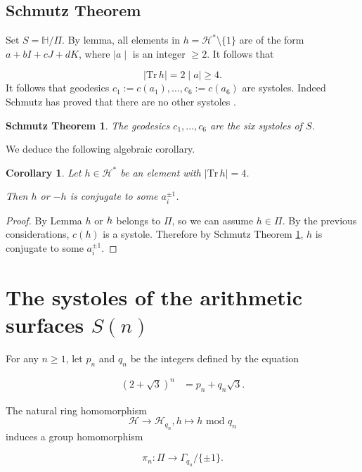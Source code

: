 \documentclass[12pt]{amsart}
\newcommand{\HP}{\mathbb{H}}
\newcommand{\Tr}{{\mathrm {Tr}}}
\renewcommand{\mod}{\,\mathrm{mod}\,}
\newtheorem{Schmutz}[lemma]{Schmutz Theorem}
\newtheorem{cor}[lemma]{Corollary}
\newcommand{\cH}{\mathcal{H}}
\begin{document}
\subsection{Schmutz Theorem}


Set $S=\HP/\Pi$. By lemma, all elements in
$h=\cH^*\setminus\{1\}$ are of the form
$a+bI+cJ+dK$, where $\mid a\mid $ is an integer $\geq 2$.
It follows that 

$$\mid\Tr\,h\mid =2\mid a\mid \geq 4.$$
It follows that  geodesics $c_1:=c(a_1),\ldots, c_6:=c(a_6)$ are
systoles. Indeed Schmutz has proved that there are no other systoles \cite{SS}.


\begin{Schmutz} \label{schmutz} The geodesics $c_1,\ldots, c_6$ are the six systoles of $S$.
\end{Schmutz}

We deduce the following algebraic corollary.

\begin{cor}\label{corSchmutz} Let $h\in\cH^*$ be an element
with $\mid\Tr\,h\mid=4$. 

Then $h$ or $-h$ is conjugate to some 
$a_i^{\pm1}$.
\end{cor} 

\begin{proof}  By Lemma $h$ or $\-h$ belongs to $\Pi$,
so we can assume $h\in\Pi$.
By the previous considerations, $c(h)$ is
a systole. Therefore by
Schmutz Theorem \ref{schmutz},
$h$ is conjugate to some 
$a_i^{\pm1}$.
\end{proof} 










\section{The systoles of the arithmetic surfaces $S(n)$}

For any $n\geq 1$, let $p_n$ and $q_n$ 
be the integers defined by the equation

\begin{align}
(2+\sqrt{3})^n&=p_n+q_n\sqrt{3}.\label{defpq}
\end{align}

\noindent The natural
ring homomorphism 
$$\cH\to \cH_{q_n}, h\mapsto h\,\mod\,q_n$$
 induces a group homomorphism

$$\pi_n: \Pi\to \Gamma_{q_n}/\{\pm1\}.$$
\end{document}
